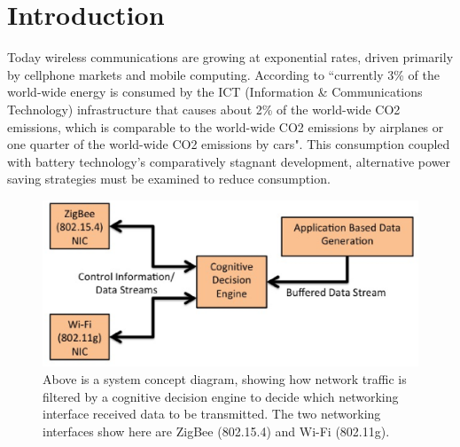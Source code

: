 \documentclass[conference]{IEEEtran}
\begin{document}
\section{Introduction}

Today wireless communications are growing at exponential rates, driven primarily by cellphone markets and mobile computing.\cite{two}  According to \cite{three} ``currently 3\% of the world-wide energy is consumed by the ICT (Information \& Communications Technology) infrastructure that causes about 2\% of the world-wide CO2 emissions, which is comparable to the world-wide CO2 emissions by airplanes or one quarter of the world-wide CO2 emissions by cars".  This consumption coupled with battery technology's comparatively stagnant development\cite{five}, alternative power saving strategies must be examined to reduce consumption.  

\begin{figure}
\begin{center}
\includegraphics[scale=0.35]{concept_diagram.eps}
\caption{Above is a system concept diagram, showing how network traffic is filtered by a cognitive decision engine to decide which networking interface received data to be transmitted.  The two networking interfaces show here are ZigBee (802.15.4) and Wi-Fi (802.11g).}
\end{center}
\end{figure}
\end{document}

